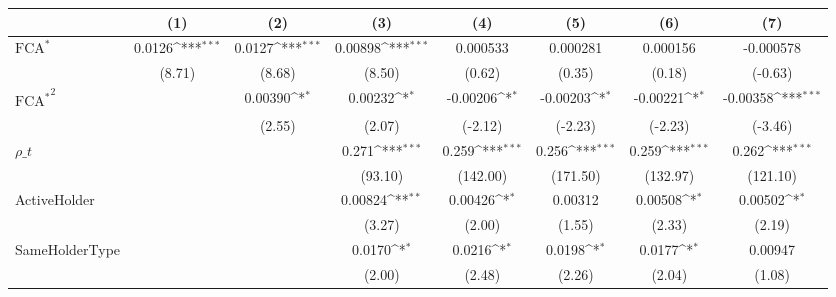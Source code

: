 {
\def\sym#1{\ifmmode^{#1}\else\(^{#1}\)\fi}
\begin{tabular}{l*{7}{c}}
\hline\hline
                    &\multicolumn{1}{c}{(1)}         &\multicolumn{1}{c}{(2)}         &\multicolumn{1}{c}{(3)}         &\multicolumn{1}{c}{(4)}         &\multicolumn{1}{c}{(5)}         &\multicolumn{1}{c}{(6)}         &\multicolumn{1}{c}{(7)}         \\
\hline
$ \text{FCA}^* $    &      0.0126\sym{***}&      0.0127\sym{***}&     0.00898\sym{***}&    0.000533         &    0.000281         &    0.000156         &   -0.000578         \\
                    &      (8.71)         &      (8.68)         &      (8.50)         &      (0.62)         &      (0.35)         &      (0.18)         &     (-0.63)         \\
[1em]
 $ { \text{FCA} ^ * } ^2 $&                     &     0.00390\sym{*}  &     0.00232\sym{*}  &    -0.00206\sym{*}  &    -0.00203\sym{*}  &    -0.00221\sym{*}  &    -0.00358\sym{***}\\
                    &                     &      (2.55)         &      (2.07)         &     (-2.12)         &     (-2.23)         &     (-2.23)         &     (-3.46)         \\
[1em]
$ \rho\_t $          &                     &                     &       0.271\sym{***}&       0.259\sym{***}&       0.256\sym{***}&       0.259\sym{***}&       0.262\sym{***}\\
                    &                     &                     &     (93.10)         &    (142.00)         &    (171.50)         &    (132.97)         &    (121.10)         \\
[1em]
ActiveHolder        &                     &                     &     0.00824\sym{**} &     0.00426\sym{*}  &     0.00312         &     0.00508\sym{*}  &     0.00502\sym{*}  \\
                    &                     &                     &      (3.27)         &      (2.00)         &      (1.55)         &      (2.33)         &      (2.19)         \\
[1em]
SameHolderType      &                     &                     &      0.0170\sym{*}  &      0.0216\sym{*}  &      0.0198\sym{*}  &      0.0177\sym{*}  &     0.00947         \\
                    &                     &                     &      (2.00)         &      (2.48)         &      (2.26)         &      (2.04)         &      (1.08)         \\

\end{tabular}}
